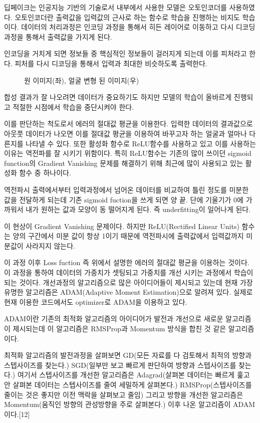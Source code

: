 \documentclass{oblivoir}
\begin{document}
딥페이크는 인공지능 기반의 기술로서 내부에서 사용한 모델은 오토인코더를 사용하였다. 오토인코더란 출력값을 입력값의 근사로 하는 함수로 학습을 진행하는 비지도 학습이다. 데이터의 처리과정은 인코딩 과정을 통해서 히든 레이어로 이동하고 다시 디코딩 과정을 통해서 출력값을 가지게 된다.

인코딩을 거치게 되면 정보들 중 핵심적인 정보들이 걸러지게 되는데 이를 피처라고 한다. 피처를 다시 디코딩을 통해서 입력과 최대한 비슷하도록 출력한다.

\begin{figure}[h!]
\centering
\caption{원 이미지(좌), 얼굴 변형 된 이미지(우)}
\end{figure}

합성 결과가 잘 나오려면 데이터가 중요하기도 하지만 모델의 학습이 올바르게 진행되고 적절한 시점에서 학습을 중단시켜야 한다.

이를 판단하는 척도로서 에러의 절대값 평균을 이용한다. 입력한 데이터의 결과값으로 아웃풋 데이터가 나오면 이를 절대값 평균을 이용하여 바꾸고자 하는 얼굴과 얼마나 다른지를 나타낼 수 있다. 또한 활성화 함수로 ReLU함수를 사용하고 있고 이를 사용하는 이유는 역전파를 잘 시키기 위함이다. 특히 ReLU함수는 기존의 많이 쓰이던 sigmoid function의 Gradient Vanishing 문제를 해결하기 위해 최근에 많이 사용되고 있는 활성화 함수 중 하나이다.

역전파시 출력에서부터 입력과정에서 넘어온 데이터를 비교하여 틀린 정도를 미분한 값을 전달하게 되는데 기존 sigmoid fuction을 쓰게 되면 양 끝. 단에 기울기가 0에 가까워서 내가 원하는 값과 모양이 동 떨어지게 된다. 즉 underfitting이 일어나게 된다.

이 현상이 Gradient Vanishing 문제이다. 하지만 ReLU(Rectified Linear Units) 함수는 양의 구간에서 미분 값이 항상 1이기 때문에 역전파시에 출력값에서 입력값까지 미분값이 사라지지 않는다.

이 과정 이후 Loss fuction 즉 위에서 설명한 에러의 절대값 평균을 이용하는 것이다. 이 과정을 통하여 데이터의 가중치가 셋팅되고 가중치를 개선 시키는 과정에서 학습이 되는 것이다. 개선과정의 알고리즘으로 많은 아이디어들이 제시되고 있는데 현재 가장 유명한 알고리즘은 ADAM(Adaptive Moment Estimation)으로 알려져 있다. 실제로 현재 이용한 코드에서도 optimizer로 ADAM을 이용하고 있다.

ADAM이란 기존의 최적화 알고리즘의 아이디어가 발전과 개선으로 새로운 알고리즘이 제시되는데 이 알고리즘은 RMSProp과 Momentum 방식을 합친 것 같은 알고리즘이다.

최적화 알고리즘의 발전과정을 살펴보면 GD(모든 자료를 다 검토해서 최적의 방향과 스텝사이즈를 찾는다.) SGD(일부만 보고 빠르게 판단하여 방향과 스텝사이즈를 찾는다.) 여기서 스텝사이즈를 개선한 알고리즘은 Adagrad(살펴본 데이터는 빠르게 훑고 안 살펴본 데이터는 스텝사이즈를 줄여 세밀하게 살펴본다.) RMSProp(스텝사이즈를 줄이는 것은 좋지만 이전 맥락을 살펴보고 줄임) 그리고 방향을 개선한 알고리즘은 Momentum(움직인 방향의 관성방향을 주로 살펴본다.) 이후 나온 알고리즘이 ADAM이다.[12]
\end{document}
